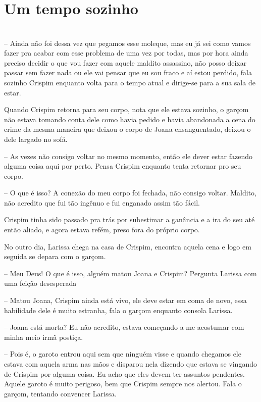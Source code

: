 \newpage


\ifdefined\useChapters
\chapter{Um tempo sozinho}

\else
\chapter{}
\fi
-- Ainda não foi dessa vez que pegamos esse moleque, mas eu já sei como vamos fazer pra acabar com esse problema de uma vez por todas, mas por hora ainda preciso decidir o que vou fazer com aquele maldito assassino, não posso deixar passar sem fazer nada ou ele vai pensar que eu sou fraco e aí estou perdido, fala sozinho Crispim enquanto volta para o tempo atual e dirige-se para a sua sala de estar.

Quando Crispim retorna para seu corpo, nota que ele estava sozinho, o garçom não estava tomando conta dele como havia pedido e havia abandonada a cena do crime da mesma maneira que deixou o corpo de Joana ensanguentado, deixou o dele largado no sofá. 

-- As vezes não consigo voltar no mesmo momento, então ele dever estar fazendo alguma coisa aqui por perto. Pensa Crispim enquanto tenta retornar pro seu corpo.

-- O que é isso? A conexão do meu corpo foi fechada, não consigo voltar. Maldito, não acredito que fui tão ingênuo e fui enganado assim tão fácil.

Crispim tinha sido passado pra trás por subestimar a ganância e a ira do seu até então aliado, e agora estava refém, preso fora do próprio corpo.

No outro dia, Larissa chega na casa de Crispim, encontra aquela cena e logo em seguida se depara com o garçom.

-- Meu Deus! O que é isso, alguém matou Joana e Crispim? Pergunta Larissa com uma feição desesperada

-- Matou Joana, Crispim ainda está vivo, ele deve estar em coma de novo, essa habilidade dele é muito estranha, fala o garçom enquanto consola Larissa.

-- Joana está morta? Eu não acredito, estava começando a me acostumar com minha meio irmã postiça.

-- Pois é, o garoto entrou aqui sem que ninguém visse e quando chegamos ele estava com aquela arma nas mãos e disparou nela dizendo que estava se vingando de Crispim por alguma coisa. Eu acho que eles devem ter assuntos pendentes. Aquele garoto é muito perigoso, bem que Crispim sempre nos alertou. Fala o garçom, tentando convencer Larissa.

